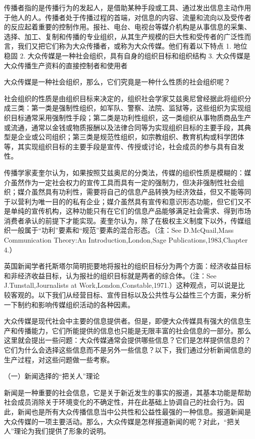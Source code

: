 \documentclass[UTF8,12pt]{ctexart}
\numberwithin{equation}{section} %
\numberwithin{figure}{section}
\numberwithin{table}{section}
\begin{document}
	传播者指的是传播行为的发起人，是借助某种手段或工具、通过发出信息主动作用于他人的人。传播者处于传播过程的首端，对信息的内容、流量和流向以及受传者的反应起着重要的控制作用。报社、电台、电视台等媒介机构是从事信息的采集、选择、加工、复制和传播的专业组织，从其生产规模的巨大性和受传者的广泛性而言，我们又把它们称为大众传播者，或称为大众传媒。他们有着以下特点
	1. 地位稳固
	2. 大众传媒是一种社会组织，具有自身的组织目标和组织结构
	3. 大众传媒是大众传播生产资料的直接控制者和使用者
	
	大众传媒是一种社会组织，那么，它们究竟是一种什么性质的社会组织呢？
	
	社会组织的性质是由组织目标来决定的，组织社会学家艾兹奥尼曾经据此将组织分成三类：第一类是强制性组织，如军队、警察、法院、监狱等，这些组织为实现组织目标通常采用强制性手段；第二类是功利性组织，这一类组织从事物质商品生产或流通，通常以金钱或物质报酬以及法律合同等为实现组织目标的主要手段，其典型是企业或公司组织；第三类是规范性组织，如宗教组织、教育机构或科学团体等，其实现组织目标的主要手段是宣传、传授或讨论，社会成员的参与具有自发性。
	
	传播学家麦奎尔认为，如果按照艾兹奥尼的分类法，传媒的组织性质是模糊的：媒介虽然作为一定社会权力的宣传工具而具有一定的强制力，但决非强制性社会组织；媒介虽然具有功利性，需要将自己的信息产品转换为经济效益，但又不能等同于以营利为唯一目的的私有企业；媒介虽然具有宣传和意识形态功能，但它们又不是单纯的宣传机构，这种功能只有在它们的信息产品能够满足社会需求、得到市场消费者承认的前提下才能实现。麦奎尔认为，除了在极权主义制度下以外，传媒组织一般属于“功利”要素和“规范”要素的混合形态。（注：See D.McQuail,Mass Communication Theory:An Introduction,London,Sage Publications,1983,Chapter 4.）
	
	英国新闻学者托斯塔尔简明扼要地将报社的组织目标分为两个方面：经济收益目标和非经济收益目标，认为报社的组织目标就是两者的综合体。（注：See J.Tunstall,Journalists at Work,London,Constable,1971.）这种观点，可以说是比较客观的。以下我们从经营目标、宣传目标以及公共性与公益性三个方面，来分析一下制约和影响传媒组织活动的各种因素。
	
	大众传媒是现代社会中主要的信息提供者。但是，即便大众传媒具有强大的信息生产和传播能力，它们所能提供的信息也只能是无限丰富的社会信息的一部分。那么这里就会提出一些问题：大众传媒通常会提供哪些信息？它们是怎样提供信息的？它们为什么会选择这些信息而不是另外一些信息？以下，我们通过分析新闻信息的生产过程，对这些问题做一些考察。
	
	
	（一）新闻选择的“把关人”理论
	
	新闻是一种重要的社会信息，它是关于新近发生的事实的报道，其基本功能是帮助社会成员消除关于环境变化的不确定性，并在此基础上协调自己的社会行为。因此，新闻也是所有大众传播信息当中公共性和公益性最强的一种信息。报道新闻是大众传媒的一项主要活动。那么，大众传媒是怎样报道新闻的呢？对此，“把关人”理论为我们提供了形象的说明。
	
\end{document}
